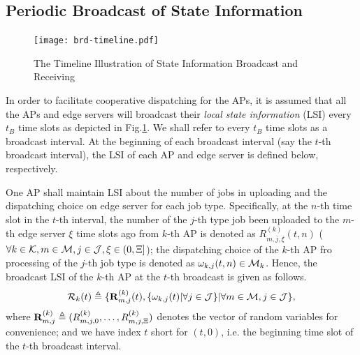 \subsection{Periodic Broadcast of State Information}

\begin{figure}[ht]
    \centering
    \texttt{[image: brd-timeline.pdf]}
    \caption{The Timeline Illustration of State Information Broadcast and Receiving}
    \label{fig:brd-timeline}
\end{figure}

In order to facilitate cooperative dispatching for the APs, it is assumed that all the APs and edge servers will broadcast their \emph{local state information} (LSI) every $t_B$ time slots as depicted in Fig.\ref{fig:brd-timeline}.
We shall refer to every $t_B$ time slots as a broadcast interval.
At the beginning of each broadcast interval (say the $t$-th broadcast interval), the LSI of each AP and edge server is defined below, respectively.

\begin{definition}
    One AP shall maintain LSI about the number of jobs in uploading and the dispatching choice on edge server for each job type.
    Specifically, at the $n$-th time slot in the $t$-th interval, the number of the $j$-th type job been uploaded to the $m$-th edge server $\xi$ time slots ago from $k$-th AP is denoted as $R^{(k)}_{m,j,\xi}({t,n})$ ($\forall k\in\mathcal{K}, m\in\mathcal{M}, j\in\mathcal{J}, \xi\in(0,\Xi]$);
    the dispatching choice of the $k$-th AP fro processing of the $j$-th job type is denoted as $\omega_{k,j}(t,n) \in \mathcal{M}_{k}$.
    Hence, the broadcast LSI of the $k$-th AP at the $t$-th broadcast is given as follows.
    \begin{align}
        \mathcal{R}_{k}({t}) \triangleq \{\mathbf{R}^{(k)}_{m,j}({t}), \{\omega_{k,j}(t)|\forall j\in\mathcal{J}\} | \forall m\in\mathcal{M}, j\in\mathcal{J}\},
    \end{align}
    where $\mathbf{R}^{(k)}_{m,j} \triangleq ( R^{(k)}_{m,j,0},\dots,R^{(k)}_{m,j,\Xi} )$ denotes the vector of random variables for convenience; and we have index $t$ short for $(t, 0)$, i.e. the beginning time slot of the $t$-th broadcast interval.
\end{definition}

